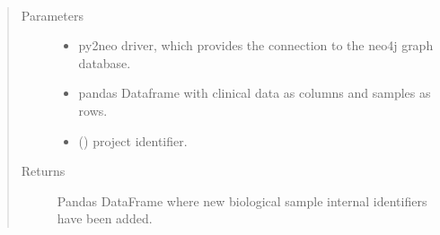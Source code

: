 \documentclass[letterpaper,10pt,english]{sphinxmanual}
\begin{document}
\begin{fulllineitems}
\label{\detokenize{_autosummary/report_manager.apps:report_manager.apps.dataUpload.check_external_ids_in_db}}
\end{fulllineitems}


\begin{fulllineitems}
\label{\detokenize{_autosummary/report_manager.apps:report_manager.apps.dataUpload.remove_samples_nodes_db}}
\end{fulllineitems}


\begin{fulllineitems}
\label{\detokenize{_autosummary/report_manager.apps:report_manager.apps.dataUpload.create_new_subjects}}~\begin{quote}\begin{description}
\item[{Parameters}] \leavevmode\begin{itemize}
\item {} 
 \textendash{} py2neo driver, which provides the connection to the neo4j graph database.

\item {} 
 \textendash{} pandas Dataframe with clinical data as columns and samples as rows.

\item {} 
 () \textendash{} project identifier.

\end{itemize}

\item[{Returns}] \leavevmode
Pandas DataFrame where new biological sample internal identifiers have been added.

\end{description}\end{quote}

\end{fulllineitems}
\end{document}
